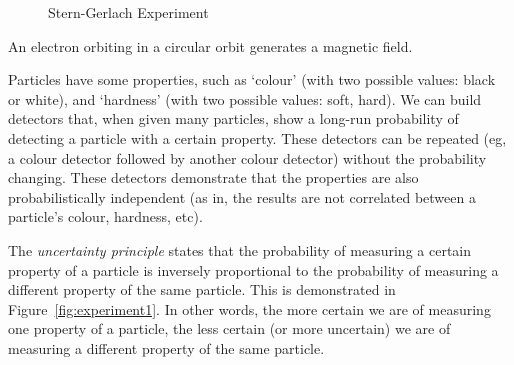 \begin{figure}[htp]
\caption{Stern-Gerlach Experiment}\label{fig:stern_gerlach}\end{figure}
\begin{note}
    An electron orbiting in a circular orbit generates a magnetic field.
\end{note}
Particles have some properties, such as `colour' (with two possible values: black or white), and `hardness' (with two possible values: soft, hard). We can build detectors that, when given many particles, show a long-run probability of detecting a particle with a certain property. These detectors can be repeated (eg, a colour detector followed by another colour detector) without the probability changing. These detectors demonstrate that the properties are also probabilistically independent (as in, the results are not correlated between a particle's colour, hardness, etc).

\begin{definition}
    The \emph{uncertainty principle} states that the probability of measuring a certain property of a particle is inversely proportional to the probability of measuring a different property of the same particle. This is demonstrated in Figure~\ref{fig:experiment1}. In other words, the more certain we are of measuring one property of a particle, the less certain (or more uncertain) we are of measuring a different property of the same particle.
\end{definition}

